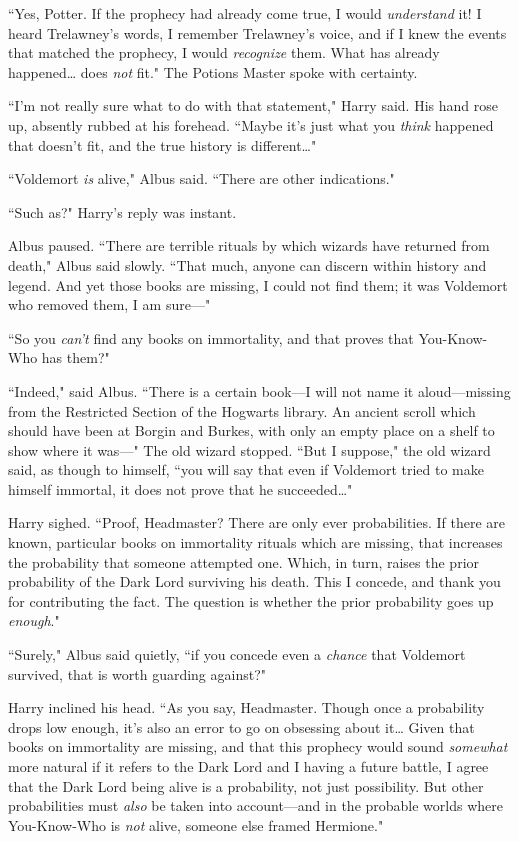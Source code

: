 ``Yes, Potter. If the prophecy had already come true, I would \emph{understand} it! I heard Trelawney's words, I remember Trelawney's voice, and if I knew the events that matched the prophecy, I would \emph{recognize} them. What has already happened{\ldots} does \emph{not} fit." The Potions Master spoke with certainty.

``I'm not really sure what to do with that statement," Harry said. His hand rose up, absently rubbed at his forehead. ``Maybe it's just what you \emph{think} happened that doesn't fit, and the true history is different{\ldots}"

``Voldemort \emph{is} alive," Albus said. ``There are other indications."

``Such as?" Harry's reply was instant.

Albus paused. ``There are terrible rituals by which wizards have returned from death," Albus said slowly. ``That much, anyone can discern within history and legend. And yet those books are missing, I could not find them; it was Voldemort who removed them, I am sure—"

``So you \emph{can't} find any books on immortality, and that proves that You-Know-Who has them?"

``Indeed," said Albus. ``There is a certain book—I will not name it aloud—missing from the Restricted Section of the Hogwarts library. An ancient scroll which should have been at Borgin and Burkes, with only an empty place on a shelf to show where it was—" The old wizard stopped. ``But I suppose," the old wizard said, as though to himself, ``you will say that even if Voldemort tried to make himself immortal, it does not prove that he succeeded{\ldots}"

Harry sighed. ``Proof, Headmaster? There are only ever probabilities. If there are known, particular books on immortality rituals which are missing, that increases the probability that someone attempted one. Which, in turn, raises the prior probability of the Dark Lord surviving his death. This I concede, and thank you for contributing the fact. The question is whether the prior probability goes up \emph{enough}."

``Surely," Albus said quietly, ``if you concede even a \emph{chance} that Voldemort survived, that is worth guarding against?"

Harry inclined his head. ``As you say, Headmaster. Though once a probability drops low enough, it's also an error to go on obsessing about it{\ldots} Given that books on immortality are missing, and that this prophecy would sound \emph{somewhat} more natural if it refers to the Dark Lord and I having a future battle, I agree that the Dark Lord being alive is a probability, not just possibility. But other probabilities must \emph{also} be taken into account—and in the probable worlds where You-Know-Who is \emph{not} alive, someone else framed Hermione."

